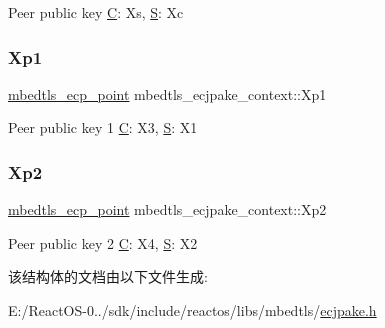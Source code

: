 Peer public key \hyperlink{struct_c}{C}\+: Xs, \hyperlink{struct_s}{S}\+: Xc \mbox{\label{structmbedtls__ecjpake__context_a3278c6093f4ef2bfd90984fc3d4cf773}} 
\subsubsection{\texorpdfstring{Xp1}{Xp1}}
{\footnotesize\ttfamily \hyperlink{structmbedtls__ecp__point}{mbedtls\+\_\+ecp\+\_\+point} mbedtls\+\_\+ecjpake\+\_\+context\+::\+Xp1}

Peer public key 1 \hyperlink{struct_c}{C}\+: X3, \hyperlink{struct_s}{S}\+: X1 \mbox{\label{structmbedtls__ecjpake__context_a586f1c91152f57b4398b5e9711b93c46}} 
\subsubsection{\texorpdfstring{Xp2}{Xp2}}
{\footnotesize\ttfamily \hyperlink{structmbedtls__ecp__point}{mbedtls\+\_\+ecp\+\_\+point} mbedtls\+\_\+ecjpake\+\_\+context\+::\+Xp2}

Peer public key 2 \hyperlink{struct_c}{C}\+: X4, \hyperlink{struct_s}{S}\+: X2 

该结构体的文档由以下文件生成\+:\begin{DoxyCompactItemize}
\item 
E\+:/\+React\+O\+S-\/0../sdk/include/reactos/libs/mbedtls/\hyperlink{ecjpake_8h}{ecjpake.\+h}\end{DoxyCompactItemize}
